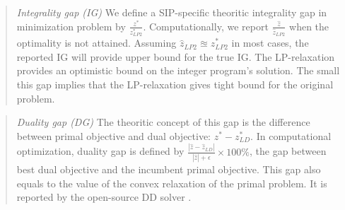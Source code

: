 \begin{quote}
	\noindent\textit{Integrality gap (IG)} We define a SIP-specific theoritic integrality gap in minimization problem by $\frac{z^*}{z^*_{LP2}}$. Computationally, we report $\frac{\hat{z}}{\hat{z}_{LP2}}$ when the optimality is not attained. Assuming $\hat{z}_{LP2}\approxeq z^*_{LP2}$ in most cases, the reported IG will provide upper bound for the true IG. The LP-relaxation provides an optimistic bound on the integer program's solution. The small this gap implies that the LP-relaxation gives tight bound for the original problem.  %
\end{quote}

%

\begin{quote}
\noindent\textit{Duality gap (DG)} The theoritic concept of this gap is the difference between primal objective and dual objective: $z^*-z^*_{LD}$. In computational optimization, duality gap is defined by $\frac{|\hat{z}-\hat{z}_{LD}|}{|\hat{z}|+\epsilon}\times 100\%$, the gap between best dual objective and the incumbent primal objective. This gap also equals to the value of the convex relaxation of the primal problem. It is reported by the open-source DD solver \dsp. 
\end{quote}

